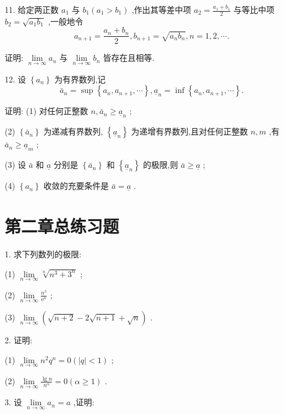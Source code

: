11. 给定两正数 \({a}_{1}\) 与 \({b}_{1}\left( {{a}_{1} > {b}_{1}}\right)\) ,作出其等差中项 \({a}_{2} = \frac{{a}_{1} + {b}_{1}}{2}\) 与等比中项 \({b}_{2} = \sqrt{{a}_{1}{b}_{1}}\) ,一般地令
\[
{a}_{n + 1} = \frac{{a}_{n} + {b}_{n}}{2},{b}_{n + 1} = \sqrt{{a}_{n}{b}_{n}},n = 1,2,\cdots .
\]

证明: \(\mathop{\lim }\limits_{{n \rightarrow  \infty }}{a}_{n}\) 与 \(\mathop{\lim }\limits_{{n \rightarrow  \infty }}{b}_{n}\) 皆存在且相等.

12. 设 \(\left\{  {a}_{n}\right\}\) 为有界数列,记
\[
{\bar{a}}_{n} = \sup \left\{  {{a}_{n},{a}_{n + 1},\cdots }\right\}  ,{\underline{a}}_{n} = \inf \left\{  {{a}_{n},{a}_{n + 1},\cdots }\right\}  .
\]

证明: (1) 对任何正整数 \(n,{\bar{a}}_{n} \geq  {\underline{a}}_{n}\) ;

(2) \(\left\{  {\bar{a}}_{n}\right\}\) 为递减有界数列, \(\left\{  {\underline{a}}_{n}\right\}\) 为递增有界数列,且对任何正整数 \(n,m\) ,有 \({\bar{a}}_{n} \geq  {\underline{a}}_{m}\) ;

(3) 设 \(\bar{a}\) 和 \(\underline{a}\) 分别是 \(\left\{  {\bar{a}}_{n}\right\}\) 和 \(\left\{  {\underline{a}}_{n}\right\}\) 的极限,则 \(\bar{a} \geq  \underline{a}\) ;

(4) \(\left\{  {a}_{n}\right\}\) 收敛的充要条件是 \(\bar{a} = \underline{a}\) .

\section{第二章总练习题}

1. 求下列数列的极限:

(1) \(\mathop{\lim }\limits_{{n \rightarrow  \infty }}\sqrt[n]{{n}^{3} + {3}^{n}}\) ;

(2) \(\mathop{\lim }\limits_{{n \rightarrow  \infty }}\frac{{n}^{5}}{{\mathrm{e}}^{n}}\) ;

(3) \(\mathop{\lim }\limits_{{n \rightarrow  \infty }}\left( {\sqrt{n + 2} - 2\sqrt{n + 1} + \sqrt{n}}\right)\) .

2. 证明:

(1) \(\mathop{\lim }\limits_{{n \rightarrow  \infty }}{n}^{2}{q}^{n} = 0\left( {\left| q\right|  < 1}\right)\) ;

(2) \(\mathop{\lim }\limits_{{n \rightarrow  \infty }}\frac{\lg n}{{n}^{\alpha }} = 0\left( {\alpha  \geq  1}\right)\) .

3. 设 \(\mathop{\lim }\limits_{{n \rightarrow  \infty }}{a}_{n} = a\) ,证明:

